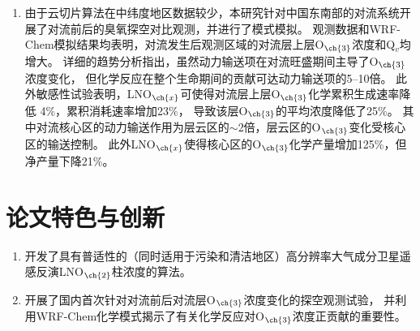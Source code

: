 \begin{enumerate}[label=（\arabic*）, labelindent=\parindent, nosep, leftmargin=0pt, widest=0, itemindent=*, topsep=0pt, partopsep=0pt, parsep=0pt]
\item 由于云切片算法在中纬度地区数据较少，本研究针对中国东南部的对流系统开展了对流前后的臭氧探空对比观测，并进行了模式模拟。
观测数据和WRF-Chem模拟结果均表明，对流发生后观测区域的对流层上层O$_{\ch{3}}$浓度和Q$_v$均增大。
详细的趋势分析指出，虽然动力输送项在对流旺盛期间主导了O$_{\ch{3}}$浓度变化，
但化学反应在整个生命期间的贡献可达动力输送项的5--10倍。
此外敏感性试验表明，LNO$_{\ch{x}}$可使得对流层上层O$_{\ch{3}}$化学累积生成速率降低 4\%，累积消耗速率增加23\%，
导致该层O$_{\ch{3}}$的平均浓度降低了25\%。
其中对流核心区的动力输送作用为层云区的$\sim$2倍，层云区的O$_{\ch{3}}$变化受核心区的输送控制。
此外LNO$_{\ch{x}}$使得核心区的O$_{\ch{3}}$化学产量增加125\%，但净产量下降21\%。


\end{enumerate}

\section{论文特色与创新}

\begin{enumerate}[label=（\arabic*）, labelindent=\parindent, nosep, leftmargin=0pt, widest=0, itemindent=*, topsep=0pt, partopsep=0pt, parsep=0pt]

\item 开发了具有普适性的（同时适用于污染和清洁地区）高分辨率大气成分卫星遥感反演LNO$_{\ch{2}}$柱浓度的算法。

\item 开展了国内首次针对对流前后对流层O$_{\ch{3}}$浓度变化的探空观测试验，
并利用WRF-Chem化学模式揭示了有关化学反应对O$_{\ch{3}}$浓度正贡献的重要性。





\end{enumerate}




